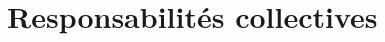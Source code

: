 \documentclass[12pt]{article}
\newcommand{\cvitem}[2]{\item[#1] #2}
\newcounter{cvitems}
\begin{document}
\section{Responsabilités collectives}








\end{document}
